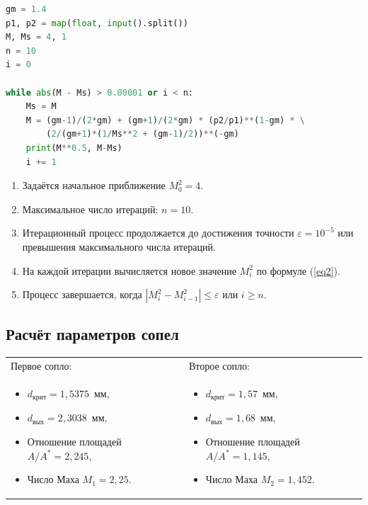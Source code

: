 \documentclass[12pt,a4paper]{article}
\begin{document}
\begin{lstlisting}[language=Python, caption={Расчёт числа Маха через отношение давлений}]
gm = 1.4
p1, p2 = map(float, input().split())
M, Ms = 4, 1
n = 10
i = 0

while abs(M - Ms) > 0.00001 or i < n:
    Ms = M
    M = (gm-1)/(2*gm) + (gm+1)/(2*gm) * (p2/p1)**(1-gm) * \
        (2/(gm+1)*(1/Ms**2 + (gm-1)/2))**(-gm)
    print(M**0.5, M-Ms)
    i += 1
\end{lstlisting}


\begin{enumerate}
    \item Задаётся начальное приближение $M^2_0 = 4$.
    \item Максимальное число итераций: $n = 10$.
    \item Итерационный процесс продолжается до достижения точности $\varepsilon = 10^{-5}$ или превышения максимального числа итераций.
    \item На каждой итерации вычисляется новое значение $M^2_i$ по формуле (\ref{eq2}).
    \item Процесс завершается, когда $|M^2_i - M^2_{i-1}| \leq \varepsilon$ или $i \geq n$.
\end{enumerate}

\subsection{Расчёт параметров сопел}

\begin{center}
\begin{tabular}{p{} p{}}
{Первое сопло:} & {Второе сопло:} \\
\begin{itemize}
    \item $d_{\text{крит}} = 1,5375$~мм,
    \item $d_{\text{вых}} = 2,3038$~мм,
    \item Отношение площадей $A/A^* = 2,245$,
    \item Число Маха $M_1 = 2,25$.
\end{itemize}
&
\begin{itemize}
    \item $d_{\text{крит}} = 1,57$~мм,
    \item $d_{\text{вых}} = 1,68$~мм,
    \item Отношение площадей $A/A^* = 1,145$,
    \item Число Маха $M_2 = 1,452$.
\end{itemize}
\\
\end{tabular}
\end{center}
\end{document}
